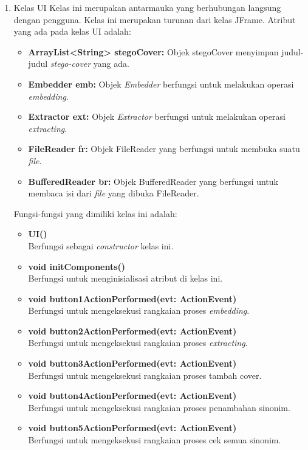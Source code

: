 \begin{enumerate}
	\item Kelas UI
	Kelas ini merupakan antarmauka yang berhubungan langsung dengan pengguna. Kelas ini merupakan turunan dari kelas JFrame. Atribut yang ada pada kelas UI adalah:
	\begin{itemize}
		\item \textbf{ArrayList<String> stegoCover:} Objek stegoCover menyimpan judul-judul \textit{stego-cover} yang ada.
		\item \textbf{Embedder emb:} Objek \textit{Embedder} berfungsi untuk melakukan operasi \textit{embedding}.
		\item \textbf{Extractor ext:} Objek \textit{Extractor} berfungsi untuk melakukan operasi \textit{extracting}.
		\item \textbf{FileReader fr:} Objek FileReader yang berfungsi untuk membuka suatu \textit{file}.
		\item \textbf{BufferedReader br:} Objek BufferedReader yang berfungsi untuk membaca isi dari \textit{file} yang dibuka FileReader.
	\end{itemize}
	
		Fungsi-fungsi yang dimiliki kelas ini adalah:
		
	\begin{itemize}
		\item \textbf{UI()}\\
		Berfungsi sebagai \textit{constructor} kelas ini.\\	
		
		\item \textbf{void initComponents()}\\
		Berfungsi untuk menginisialisasi atribut di kelas ini.
		
		\item \textbf{void button1ActionPerformed(evt: ActionEvent)}\\
		Berfungsi untuk mengeksekusi rangkaian proses \textit{embedding}.\\
		
		\item \textbf{void button2ActionPerformed(evt: ActionEvent)}\\
		Berfungsi untuk mengeksekusi rangkaian proses \textit{extracting}.\\
		
		\item \textbf{void button3ActionPerformed(evt: ActionEvent)}\\
		Berfungsi untuk mengeksekusi rangkaian proses tambah cover.\\
		
		\item \textbf{void button4ActionPerformed(evt: ActionEvent)}\\
		Berfungsi untuk mengeksekusi rangkaian proses penambahan sinonim.\\
		
		\item \textbf{void button5ActionPerformed(evt: ActionEvent)}\\
		Berfungsi untuk mengeksekusi rangkaian proses cek semua sinonim.\\
	\end{itemize}
\end{enumerate}

